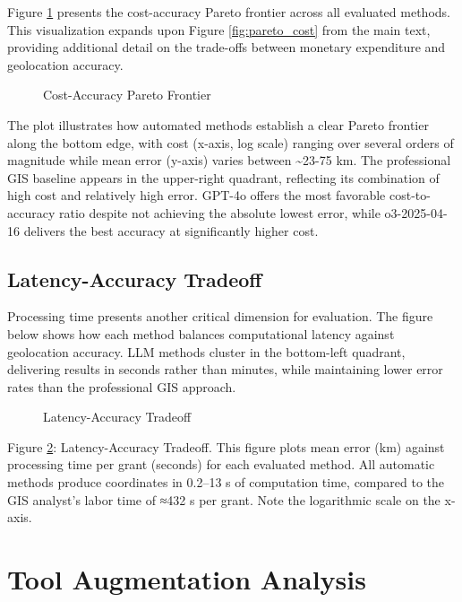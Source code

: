Figure \ref{fig:pareto_cost_appendix} presents the cost-accuracy Pareto
frontier across all evaluated methods. This visualization expands upon
Figure \ref{fig:pareto_cost} from the main text, providing additional
detail on the trade-offs between monetary expenditure and geolocation
accuracy.

\begin{figure}
\centering
{}
\caption{Cost-Accuracy Pareto Frontier}\label{fig:pareto_cost_appendix}
\end{figure}

The plot illustrates how automated methods establish a clear Pareto
frontier along the bottom edge, with cost (x-axis, log scale) ranging
over several orders of magnitude while mean error (y-axis) varies
between \textasciitilde23-75 km. The professional GIS baseline appears
in the upper-right quadrant, reflecting its combination of high cost and
relatively high error. GPT-4o offers the most favorable cost-to-accuracy
ratio despite not achieving the absolute lowest error, while
o3-2025-04-16 delivers the best accuracy at significantly higher cost.

\subsection{Latency-Accuracy
Tradeoff}\label{c.4-latency-accuracy-tradeoff}

Processing time presents another critical dimension for evaluation. The
figure below shows how each method balances computational latency
against geolocation accuracy. LLM methods cluster in the bottom-left
quadrant, delivering results in seconds rather than minutes, while
maintaining lower error rates than the professional GIS approach.

\begin{figure}
\centering
{}
\caption{Latency-Accuracy Tradeoff}\label{fig:pareto_latency}
\end{figure}

Figure \ref{fig:pareto_latency}: Latency-Accuracy Tradeoff. This figure
plots mean error (km) against processing time per grant (seconds) for
each evaluated method. All automatic methods produce coordinates in
0.2--13 s of computation time, compared to the GIS analyst's labor time
of ≈432 s per grant. Note the logarithmic scale on the x-axis.

\section{Tool Augmentation
Analysis}\label{appendix-d-tool-augmentation-analysis}

